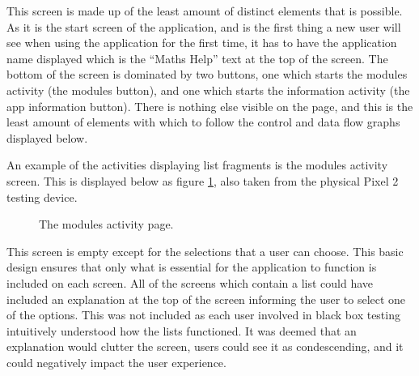 \documentclass{article}
\begin{document}
This screen is made up of the least amount of distinct elements that is possible. As it is the start screen of the application, and is the first thing a new user will see when using the application for the first time, it has to have the application name displayed which is the ``Maths Help'' text at the top of the screen. The bottom of the screen is dominated by two buttons, one which starts the modules activity (the modules button), and one which starts the information activity (the app information button). There is nothing else visible on the page, and this is the least amount of elements with which to follow the control and data flow graphs displayed below. \par

An example of the activities displaying list fragments is the modules activity screen. This is displayed below as figure \ref{figure:applicationModulesPage}, also taken from the physical Pixel 2 testing device. 

\begin{figure}[H]
	\centering
	\caption{The modules activity page.}
	\label{figure:applicationModulesPage}
\end{figure}

This screen is empty except for the selections that a user can choose. This basic design ensures that only what is essential for the application to function is included on each screen. All of the screens which contain a list could have included an explanation at the top of the screen informing the user to select one of the options. This was not included as each user involved in black box testing intuitively understood how the lists functioned. It was deemed that an explanation would clutter the screen, users could see it as condescending, and it could negatively impact the user experience. \par
\end{document}
